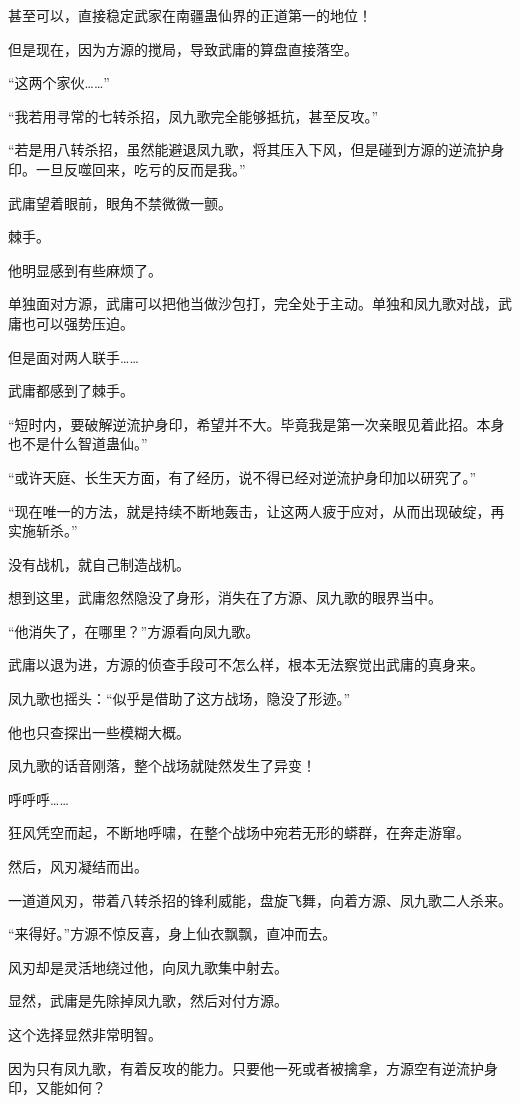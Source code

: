 \begin{this_body}
甚至可以，直接稳定武家在南疆蛊仙界的正道第一的地位！

但是现在，因为方源的搅局，导致武庸的算盘直接落空。

“这两个家伙……”

“我若用寻常的七转杀招，凤九歌完全能够抵抗，甚至反攻。”

“若是用八转杀招，虽然能避退凤九歌，将其压入下风，但是碰到方源的逆流护身印。一旦反噬回来，吃亏的反而是我。”

武庸望着眼前，眼角不禁微微一颤。

棘手。

他明显感到有些麻烦了。

单独面对方源，武庸可以把他当做沙包打，完全处于主动。单独和凤九歌对战，武庸也可以强势压迫。

但是面对两人联手……

武庸都感到了棘手。

“短时内，要破解逆流护身印，希望并不大。毕竟我是第一次亲眼见着此招。本身也不是什么智道蛊仙。”

“或许天庭、长生天方面，有了经历，说不得已经对逆流护身印加以研究了。”

“现在唯一的方法，就是持续不断地轰击，让这两人疲于应对，从而出现破绽，再实施斩杀。”

没有战机，就自己制造战机。

想到这里，武庸忽然隐没了身形，消失在了方源、凤九歌的眼界当中。

“他消失了，在哪里？”方源看向凤九歌。

武庸以退为进，方源的侦查手段可不怎么样，根本无法察觉出武庸的真身来。

凤九歌也摇头：“似乎是借助了这方战场，隐没了形迹。”

他也只查探出一些模糊大概。

凤九歌的话音刚落，整个战场就陡然发生了异变！

呼呼呼……

狂风凭空而起，不断地呼啸，在整个战场中宛若无形的蟒群，在奔走游窜。

然后，风刃凝结而出。

一道道风刃，带着八转杀招的锋利威能，盘旋飞舞，向着方源、凤九歌二人杀来。

“来得好。”方源不惊反喜，身上仙衣飘飘，直冲而去。

风刃却是灵活地绕过他，向凤九歌集中射去。

显然，武庸是先除掉凤九歌，然后对付方源。

这个选择显然非常明智。

因为只有凤九歌，有着反攻的能力。只要他一死或者被擒拿，方源空有逆流护身印，又能如何？


\end{this_body}
